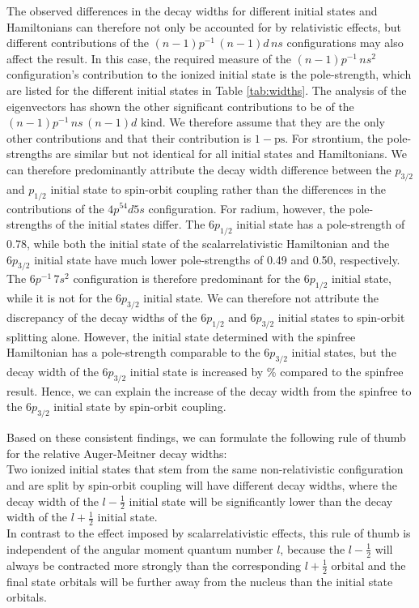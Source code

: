 \documentclass[aps,amssymb,preprint,a4paper,longbibliography]{revtex4}
\begin{document}
The observed differences in the decay widths for different initial states and
Hamiltonians can therefore not only be accounted for by relativistic
effects, but different contributions of the $(n-1)p^{-1} \,(n-1)d \, ns$
configurations may also affect the result.
In this case, the required measure of the $(n-1)p^{-1} \, ns^2$ configuration's
contribution to the ionized initial state is the pole-strength,
which are listed for the different initial states in Table \ref{tab:widths}.
The analysis of the eigenvectors has shown the other significant contributions
to be of the $(n-1)p^{-1} \,ns \, (n-1)d$ kind. We therefore assume that
they are the only other contributions and that their contribution is $1-\text{ps}$.
For strontium, the pole-strengths are similar but not identical for all initial
states and Hamiltonians. 
We can therefore predominantly attribute the decay width difference between the
$p_{3/2}$ and $p_{1/2}$ initial state to spin-orbit coupling rather than the
differences in the contributions of the $4p^54d5s$ configuration.
For radium, however, the pole-strengths of the initial states differ.
The $6p_{1/2}$ initial state has a pole-strength of 0.78, while both the
initial state of the scalarrelativistic Hamiltonian and the $6p_{3/2}$ initial
state have much lower pole-strengths of 0.49 and 0.50, respectively.
The $6p^{-1} \,7s^2$ configuration is therefore predominant for the $6p_{1/2}$
initial state, while it is not for the $6p_{3/2}$ initial state.
We can therefore not attribute the discrepancy of the decay widths of the
$6p_{1/2}$ and $6p_{3/2}$ initial states to spin-orbit splitting alone.
However, the initial state determined with the spinfree
Hamiltonian has a pole-strength comparable to the $6p_{3/2}$ initial states,
but the decay width of the $6p_{3/2}$ initial state is increased by \unit[236]{\%}
compared to the spinfree result.
Hence, we can explain the increase of the decay width from the spinfree to the
$6p_{3/2}$ initial state by spin-orbit coupling.


Based on these consistent findings, we can formulate the following rule of thumb for
the relative Auger-Meitner decay widths:\\
Two ionized initial states that stem from the same non-relativistic configuration and
are split by spin-orbit coupling will have different decay widths, where the decay width
of the $l-\frac12$ initial state will be significantly lower than the decay width of
the $l + \frac12$ initial state.\\
In contrast to the effect imposed by scalarrelativistic effects, this rule
of thumb is independent of the angular moment quantum number $l$, because the
$l-\frac12$ will always be contracted more strongly than the corresponding
$l+\frac12$ orbital and the final state orbitals will be further away from
the nucleus than the initial state orbitals.
\end{document}
